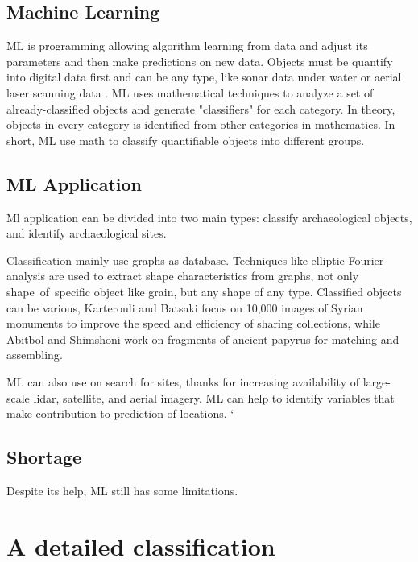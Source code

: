 \documentclass[journal]{IEEEtran}
\begin{document}
	\subsection{Machine Learning}
	
	ML is programming allowing algorithm learning from data and adjust its parameters and then make predictions on new data. Objects must be quantify into digital data first and can be any type, like sonar data under water\cite{Drap2018UnderwaterPF} or aerial
	laser scanning data \cite{rs10020225}. ML uses mathematical techniques to analyze a set of already-classified objects and generate "classifiers" for each category. In theory, objects in every category is identified from other categories in mathematics. In short, ML use math to classify quantifiable objects into different groups.\cite{bickler_2021}
	
	\subsection{ML Application}
	
	Ml application can be divided into two main types: classify archaeological objects, and identify archaeological sites.
	
	Classification mainly use graphs as database. Techniques like elliptic Fourier analysis are used to extract shape characteristics from graphs, not only shape of specific object like grain\cite{MEBATSION201263}, but any shape of any type\cite{KUHL1982236}. Classified objects can be various, Karterouli and Batsaki focus on 10,000 images of Syrian monuments to improve the speed and efficiency of sharing collections\cite{Syrian_images}, while Abitbol and Shimshoni work on fragments of ancient papyrus for matching and assembling\cite{Papyrus}. 
	
	ML can also use on search for sites, thanks for increasing availability of large-scale lidar, satellite, and aerial imagery. ML can help to identify variables that make contribution to prediction of locations\cite{bickler_2021}. `
	
	\subsection{Shortage}
	
	Despite its help, ML still has some limitations.
	
	\section{A detailed classification}\label{example}
	
\end{document}
